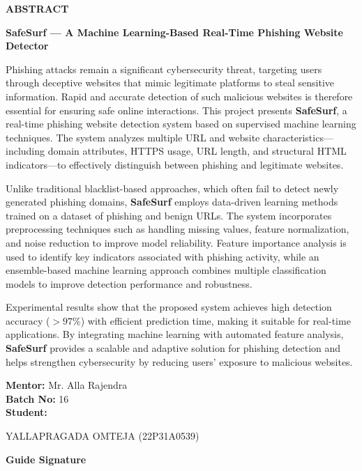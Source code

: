 \begin{center}
{\bfseries\fontsize{16}{18}\selectfont ABSTRACT}
\end{center}


\vspace{0.5cm}

\noindent
\textbf{SafeSurf — A Machine Learning-Based Real-Time Phishing Website Detector}

\vspace{0.5cm}

\noindent
Phishing attacks remain a significant cybersecurity threat, targeting users through deceptive websites that mimic legitimate platforms to steal sensitive information. Rapid and accurate detection of such malicious websites is therefore essential for ensuring safe online interactions. This project presents \textbf{SafeSurf}, a real-time phishing website detection system based on supervised machine learning techniques. The system analyzes multiple URL and website characteristics—including domain attributes, HTTPS usage, URL length, and structural HTML indicators—to effectively distinguish between phishing and legitimate websites.

\vspace{0.3cm}

\noindent
Unlike traditional blacklist-based approaches, which often fail to detect newly generated phishing domains, \textbf{SafeSurf} employs data-driven learning methods trained on a dataset of phishing and benign URLs. The system incorporates preprocessing techniques such as handling missing values, feature normalization, and noise reduction to improve model reliability. Feature importance analysis is used to identify key indicators associated with phishing activity, while an ensemble-based machine learning approach combines multiple classification models to improve detection performance and robustness.

\vspace{0.3cm}

\noindent
Experimental results show that the proposed system achieves high detection accuracy ($> 97\%$) with efficient prediction time, making it suitable for real-time applications. By integrating machine learning with automated feature analysis, \textbf{SafeSurf} provides a scalable and adaptive solution for phishing detection and helps strengthen cybersecurity by reducing users’ exposure to malicious websites.

\vspace{1cm}

\noindent
\textbf{Mentor:} Mr. Alla Rajendra\\
\textbf{Batch No:} 16\\
\textbf{Student:}

\vspace{0.2cm}

\noindent
YALLAPRAGADA OMTEJA (22P31A0539)

\vspace{1.5cm}

\begin{flushright}
\textbf{Guide Signature}
\end{flushright}